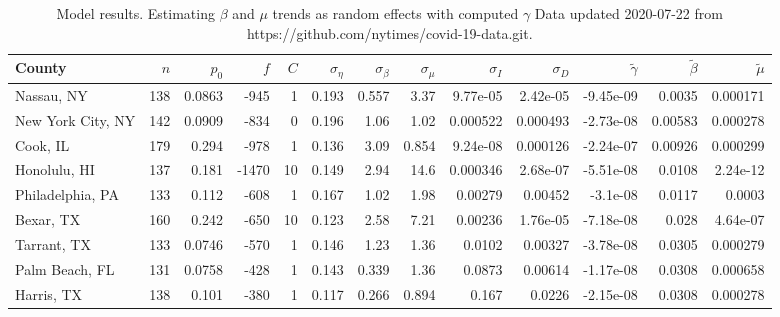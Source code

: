 \documentclass[12pt,letterpaper]{article}
\begin{document}
\begin{sidewaystable}
\caption{\label{tab:uncons}
Model results. Estimating $\beta$ and $\mu$ trends as random effects
with computed $\gamma$
Data updated 2020-07-22 from
https://github.com/nytimes/covid-19-data.git.
}
\centering
{\small


\begin{tabular}{lrrrrrrrrrrrr}
\hline
 County            &   $n$ &   $p_0$ &   $f$ &   $C$ &   $\sigma_\eta$ &   $\sigma_\beta$ &   $\sigma_\mu$ &   $\sigma_I$ &   $\sigma_D$ &   $\tilde\gamma$ &   $\tilde{\beta}$ &   $\tilde{\mu}$ \\
\hline
 Nassau, NY        &   138 &  0.0863 &  -945 &     1 &           0.193 &            0.557 &          3.37  &     9.77e-05 &     2.42e-05 &        -9.45e-09 &           0.0035  &        0.000171 \\
 New York City, NY &   142 &  0.0909 &  -834 &     0 &           0.196 &            1.06  &          1.02  &     0.000522 &     0.000493 &        -2.73e-08 &           0.00583 &        0.000278 \\
 Cook, IL          &   179 &  0.294  &  -978 &     1 &           0.136 &            3.09  &          0.854 &     9.24e-08 &     0.000126 &        -2.24e-07 &           0.00926 &        0.000299 \\
 Honolulu, HI      &   137 &  0.181  & -1470 &    10 &           0.149 &            2.94  &         14.6   &     0.000346 &     2.68e-07 &        -5.51e-08 &           0.0108  &        2.24e-12 \\
 Philadelphia, PA  &   133 &  0.112  &  -608 &     1 &           0.167 &            1.02  &          1.98  &     0.00279  &     0.00452  &        -3.1e-08  &           0.0117  &        0.0003   \\
 Bexar, TX         &   160 &  0.242  &  -650 &    10 &           0.123 &            2.58  &          7.21  &     0.00236  &     1.76e-05 &        -7.18e-08 &           0.028   &        4.64e-07 \\
 Tarrant, TX       &   133 &  0.0746 &  -570 &     1 &           0.146 &            1.23  &          1.36  &     0.0102   &     0.00327  &        -3.78e-08 &           0.0305  &        0.000279 \\
 Palm Beach, FL    &   131 &  0.0758 &  -428 &     1 &           0.143 &            0.339 &          1.36  &     0.0873   &     0.00614  &        -1.17e-08 &           0.0308  &        0.000658 \\
 Harris, TX        &   138 &  0.101  &  -380 &     1 &           0.117 &            0.266 &          0.894 &     0.167    &     0.0226   &        -2.15e-08 &           0.0308  &        0.000278 \\

\end{tabular}}
\end{sidewaystable}
\end{document}
